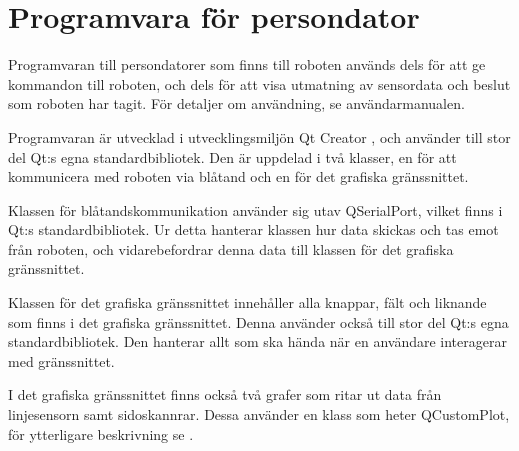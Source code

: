 \section{Programvara för persondator}
Programvaran till persondatorer som finns till roboten används dels för att ge kommandon till roboten, och dels för att visa utmatning av sensordata och beslut som roboten har tagit. För detaljer om användning, se användarmanualen.

Programvaran är utvecklad i utvecklingsmiljön Qt Creator \cite{qt}, och använder till stor del Qt:s egna standardbibliotek. Den är uppdelad i två klasser, en för att kommunicera med roboten via blåtand och en för det grafiska gränssnittet.

Klassen för blåtandskommunikation använder sig utav QSerialPort, vilket finns i Qt:s standardbibliotek. Ur detta hanterar klassen hur data skickas och tas emot från roboten, och vidarebefordrar denna data till klassen för det grafiska gränssnittet.

Klassen för det grafiska gränssnittet innehåller alla knappar, fält och liknande som finns i det grafiska gränssnittet. Denna använder också till stor del Qt:s egna standardbibliotek. Den hanterar allt som ska hända när en användare interagerar med gränssnittet.

I det grafiska gränssnittet finns också två grafer som ritar ut data från linjesensorn samt sidoskannrar. Dessa använder en klass som heter QCustomPlot, för ytterligare beskrivning se \cite{qcustomplot}.  
